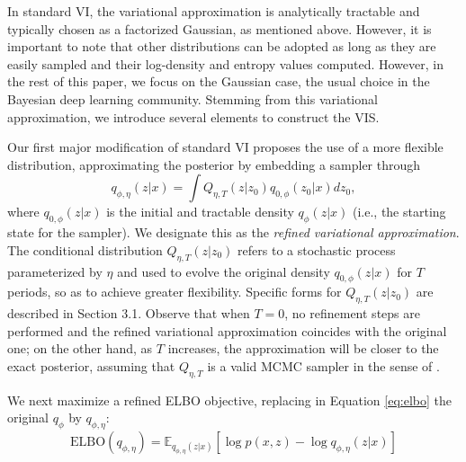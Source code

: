 In standard VI, the variational approximation %
is analytically tractable and typically chosen as a factorized Gaussian, as mentioned above. {However, it is important to note that 
other distributions can be adopted as long as they 
are easily sampled and their log-density and entropy values
computed. However, in the rest of this paper, we focus on the Gaussian case, the usual choice in the Bayesian deep learning community.}
Stemming from {this variational approximation}, we introduce several elements to construct the VIS.

Our first major modification of standard VI proposes the use of a more
flexible distribution, approximating the posterior by embedding a sampler through
\begin{equation}\label{eq:q}
q_{\phi,\eta}(z|x) = \int Q_{\eta, T}(z|z_0)q_{0,\phi}(z_0|x)dz_0,
\end{equation}
where $q_{0,\phi} (z | x)$ is the initial and tractable density
$q_{\phi} (z | x)$
(i.e., the starting state for the sampler). %
We designate this as the \emph{refined variational approximation}.
The conditional distribution $Q_{\eta, T}(z|z_0)$ refers
to a stochastic process parameterized by $\eta$ and 
used to evolve the original density $q_{0,\phi}(z|x)$
for $T$ periods, so as to achieve greater flexibility. Specific 
forms for $Q_{\eta, T}(z|z_0)$
are described in Section 3.1.
{Observe that when $T=0$, no refinement steps are performed and the refined variational approximation coincides with the original one; on the other hand, as 
 $T$ increases, the approximation will be closer to the exact posterior, assuming that $Q_{\eta, T}$ is a valid MCMC sampler
 in the sense of \cite{ma2015complete}}.

We next maximize a refined ELBO objective, replacing in Equation \ref{eq:elbo} the 
original $q_{\phi }$ 
by $q_{\phi, \eta}$:
\begin{equation}\label{eq:ELBO}
\mbox{ELBO}(q_{\phi,\eta}) = \mathbb{E}_{q_{\phi, \eta}(z|x)} \left[ \log p(x,z) - \log q_{\phi, \eta}(z|x)\right]
\end{equation}

